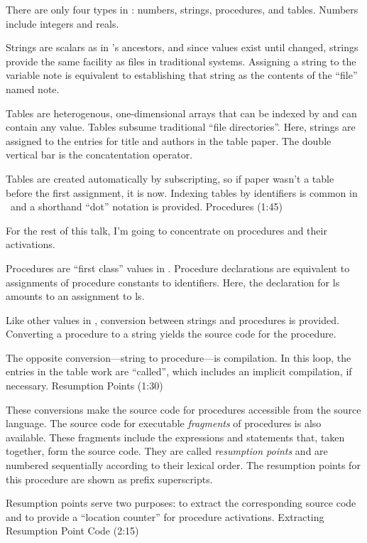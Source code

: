 There are only four types in \EZ: numbers, strings, procedures,
and tables.
Numbers include integers and reals.

Strings are scalars as in \EZ's ancestors, and
since values exist until changed,
strings provide the same facility as files in traditional systems.
Assigning a string to the variable {\pt note}
is equivalent to establishing that
string as the contents of the ``file'' named {\pt note}.

Tables are heterogenous, one-dimensional arrays
that can be indexed by and can contain any value.
Tables subsume traditional ``file directories''.
Here, strings are assigned
to the entries for {\pt title \rm and \pt authors}
in the table {\pt paper}.
The double vertical bar is the concatentation operator.

Tables are created automatically by subscripting,
so if {\pt paper} wasn't a table before the first assignment, it is now.
Indexing tables by identifiers is common in \EZ\ and a shorthand
``dot'' notation is provided.
\NewPage
\beginsection Procedures (1:45)

For the rest of this talk,
I'm going to concentrate on procedures and their activations.

Procedures are ``first class'' values in \EZ.
Procedure declarations are equivalent to assignments
of procedure constants to identifiers.
Here, the declaration for {\pt ls} amounts
to an assignment to {\pt ls}.

Like other values in \EZ, conversion between strings
and procedures is provided.
Converting a procedure to a string yields the source
code for the procedure.

The opposite conversion---string to procedure---is compilation.
In this loop, the entries in the table {\pt work} are
``called'', which includes an implicit compilation, if necessary.
\NewPage
\beginsection Resumption Points (1:30)

These conversions make
the source code for procedures accessible from the source language.
The source code for
executable {\sl fragments\/} of procedures is also available.
These fragments include the expressions and statements that, taken together,
form the source code.
They are called {\sl resumption points} and are numbered sequentially
according to their lexical order.
The resumption points for this procedure are shown as prefix superscripts.

Resumption points serve two purposes: to extract the corresponding
source code and to provide a ``location counter'' for procedure activations.
\NewPage
\beginsection Extracting Resumption Point Code (2:15)

